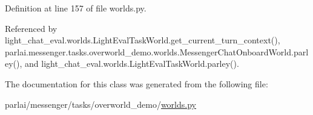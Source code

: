 Definition at line 157 of file worlds.\+py.



Referenced by light\+\_\+chat\+\_\+eval.\+worlds.\+Light\+Eval\+Task\+World.\+get\+\_\+current\+\_\+turn\+\_\+context(), parlai.\+messenger.\+tasks.\+overworld\+\_\+demo.\+worlds.\+Messenger\+Chat\+Onboard\+World.\+parley(), and light\+\_\+chat\+\_\+eval.\+worlds.\+Light\+Eval\+Task\+World.\+parley().



The documentation for this class was generated from the following file\+:\begin{DoxyCompactItemize}
\item 
parlai/messenger/tasks/overworld\+\_\+demo/\hyperlink{parlai_2messenger_2tasks_2overworld__demo_2worlds_8py}{worlds.\+py}\end{DoxyCompactItemize}
